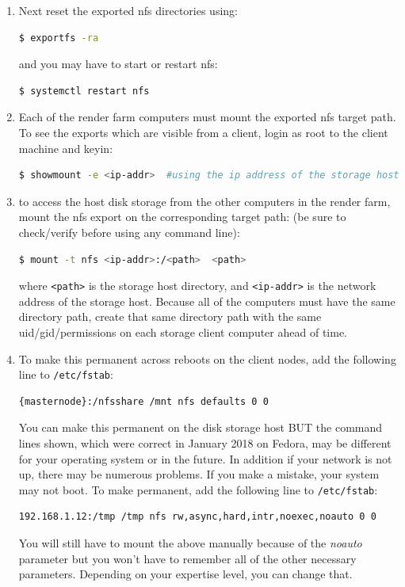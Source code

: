 \begin{description}
\begin{enumerate}
\begin{lstlisting}[language=bash,numbers=none]
        \end{lstlisting}
        \item Next reset the exported nfs directories using: 
        \begin{lstlisting}[language=bash,numbers=none]
$ exportfs -ra
        \end{lstlisting} 
        and you may have to start or restart nfs: 
        \begin{lstlisting}[language=bash,numbers=none]
$ systemctl restart nfs
        \end{lstlisting}
        \item Each of the render farm computers must mount the exported nfs target path.  To see the exports
        which are visible from a client, login as root to the client machine and keyin:
        \begin{lstlisting}[language=bash,numbers=none]
$ showmount -e <ip-addr>  #using the ip address of the storage host
        \end{lstlisting}
        \item to access the host disk storage from the other computers in the render farm, mount the nfs export on
        the corresponding target path: (be sure to check/verify before using any command line):
        \begin{lstlisting}[language=bash,numbers=none]
$ mount -t nfs <ip-addr>:/<path>  <path>
        \end{lstlisting}
        where \texttt{<path>} is the storage host directory, and \texttt{<ip-addr>} is the network address of the storage host.        
        Because all of the computers must have the same directory path, create that same directory path with the same uid/gid/permissions on each storage client computer ahead of time.
        \item To make this permanent across reboots on the client nodes, add the following line to \texttt{/etc/fstab}: 
        \begin{lstlisting}[language=bash,numbers=none]
{masternode}:/nfsshare /mnt nfs defaults 0 0
        \end{lstlisting}
        You can make this permanent on the disk storage host BUT the command lines shown, which were
        correct in January 2018 on Fedora, may be different for your operating system or in the future.  In
        addition if your network is not up, there may be numerous problems.  If you make a mistake, your
        system may not boot.  To make permanent, add the following line to \texttt{/etc/fstab}:
        \begin{lstlisting}[language=bash,numbers=none]
192.168.1.12:/tmp /tmp nfs rw,async,hard,intr,noexec,noauto 0 0
        \end{lstlisting}
        You will still have to mount the above manually because of the \textit{noauto} parameter but you won’t
        have to remember all of the other necessary parameters.  Depending on your expertise level, you can
        change that.
        

\end{enumerate}
\end{description}
